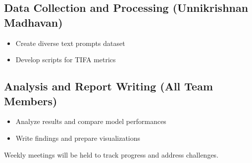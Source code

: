\documentclass{article}
\begin{document}
\subsection{Data Collection and Processing (Unnikrishnan Madhavan)}
\begin{itemize}
    \item Create diverse text prompts dataset
    \item Develop scripts for TIFA metrics
\end{itemize}

\subsection{Analysis and Report Writing (All Team Members)}
\begin{itemize}
    \item Analyze results and compare model performances
    \item Write findings and prepare visualizations
\end{itemize}

Weekly meetings will be held to track progress and address challenges.

\pagebreak

  
  
\end{document}
